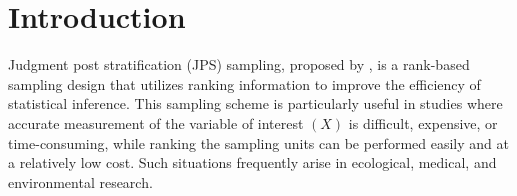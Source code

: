 \documentclass[twoside]{article}
\begin{document}
\section{Introduction}
Judgment post stratification (JPS) sampling, proposed by \cite{maceachern2004judgement}, is a rank-based sampling design that utilizes  ranking information to improve the efficiency of statistical inference. This sampling scheme is particularly useful in studies where accurate measurement of the variable of interest $(X)$ is difficult, expensive, or time-consuming, while ranking the sampling units can be performed easily and at a relatively low cost. Such situations frequently arise in ecological, medical, and environmental research.
\end{document}
